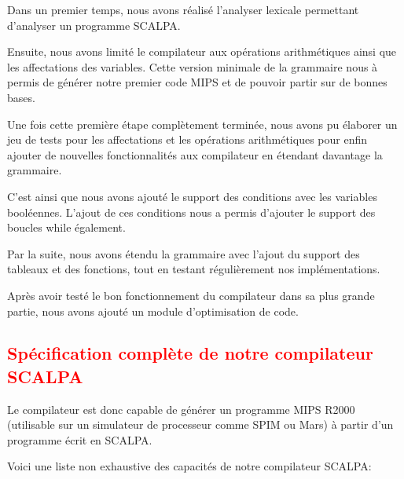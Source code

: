\documentclass[a4paper]{article}
\newcommand{\csection}[1]{\textcolor{red}{\section{#1}}}
\begin{document}
Dans un premier temps, nous avons réalisé l'analyser lexicale permettant d'analyser un programme SCALPA.

Ensuite, nous avons limité le compilateur aux opérations arithmétiques ainsi que les affectations des variables. Cette version minimale de la grammaire nous à permis de générer notre premier code MIPS et de pouvoir partir sur de bonnes bases.

Une fois cette première étape complètement terminée, nous avons pu élaborer un jeu de tests pour les affectations et les opérations arithmétiques pour enfin ajouter de nouvelles fonctionnalités aux compilateur en étendant davantage la grammaire.

C'est ainsi que nous avons ajouté le support des conditions avec les variables booléennes. L'ajout de ces conditions nous a permis d'ajouter le support des boucles while également.

Par la suite, nous avons étendu la grammaire avec l'ajout du support des tableaux et des fonctions, tout en testant régulièrement nos implémentations.

Après avoir testé le bon fonctionnement du compilateur dans sa plus grande partie, nous avons ajouté un module d'optimisation de code.

\csection{Spécification complète de notre compilateur SCALPA}

Le compilateur est donc capable de générer un programme MIPS R2000 (utilisable sur un simulateur de processeur comme SPIM ou Mars) à partir d'un programme écrit en SCALPA.

Voici une liste non exhaustive des capacités de notre compilateur SCALPA:
\end{document}

